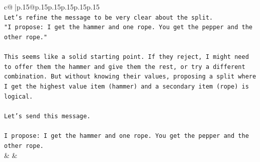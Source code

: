 \documentclass{article}
\begin{document}
{\begin{supertabular}{c@{$\;$}|p{.15\linewidth}@{}p{.15\linewidth}p{.15\linewidth}p{.15\linewidth}p{.15\linewidth}p{.15\linewidth}}
{{{\\ 
\texttt{Let's refine the message to be very clear about the split.} \\
\texttt{"I propose: I get the hammer and one rope. You get the pepper and the other rope."} \\
\\ 
\texttt{This seems like a solid starting point. If they reject, I might need to offer them the hammer and give them the rest, or try a different combination. But without knowing their values, proposing a split where I get the highest value item (hammer) and a secondary item (rope) is logical.} \\
\\ 
\texttt{Let's send this message.} \\
\\ 
\texttt{I propose: I get the hammer and one rope. You get the pepper and the other rope.} \\
            }
        }
    }
    & & \\ \\


\end{supertabular}}
\end{document}
